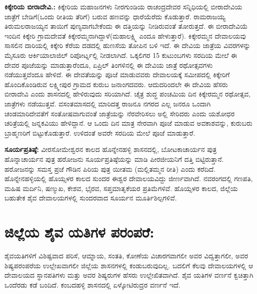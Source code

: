 \textbf{ಕಿಕ್ಕೇರಿಯ ಬೀರಾದೇವಿ.:} ಕಿಕ್ಕೇರಿಯ ಮಹಾಜನಗಳು ನೀರಗುಂಡಿಯ ರಾಚಂದ್ರದೇವರ ಸನ್ನಿಧಿಯಲ್ಲಿ ಬೀರಾದೇವಿಯ ಜಾತ್ರೆಗೆ ಬೇಡಿಗೆ(ಒಂದು ರೀತಿಯ ತೆರಿಗೆ) ಬರುವ ಹಣವನ್ನು ಧಾರೆಯೆರೆದು ಕೊಡುತ್ತಾರೆ. ರಾಮರಾಜಯ್ಯ ತಿರುಮಲರಾಜಯ್ಯನ ತಾಯಿಗೆ ಪುಣ್ಯವಾಗಬೇಕೆಂದು ಈ ದತ್ತಿಯನ್ನು ನೀಡಿರುವಂತೆ ತೋರುತ್ತದೆ. ಈ ಬೀರಾದೇವಿಯೆ ಇಂದಿನ ಕಿಕ್ಕೇರಿ ಗ್ರಾಮದೇವತೆ ಕಿಕ್ಕೇರಮ್ಮನಾಗಿದ್ದಾಳೆ(ಮಹಾಲಕ್ಷ್ಮಿ ಎಂದೂ ಹೇಳುತ್ತಾರೆ). ಕಿಕ್ಕೇರಮ್ಮನ ದೇವಾಲಯವು ಸಾಸಲಿನ ದಾರಿಯಲ್ಲಿ ಕಿಕ್ಕೇರಿ ಕೆರೆಯ ದಡದಲ್ಲಿ ಹುಣಸೆಯ ತೋಪಿನ ಬಳಿ ಇದೆ. ಈ ದೇವಿಯ ಜಾತ್ರೆಯ ವಿವರಗಳನ್ನು ಮೈಸೂರು ಆರ್ಕಿಯಾಲಾಜಿಲ್​ ರಿಪೋರ್ಟ್ನಲ್ಲಿ ನೀಡಲಾಗಿದೆ. ಒಕ್ಕಲಿಗರ 15 ಕುಟುಂಬಗಳು ಸರದಿಯ ಮೇಲೆ ಈ ದೇವರ ಪೂಜೆಯನ್ನು ಮಾಡುತ್ತಾರೆಂದೂ, ಏಪ್ರಿಲ್​ ತಿಂಗಳಿನಲ್ಲಿ ಈ ದೇವಿಯ ಜಾತ್ರೆ ರಥೋತ್ಸವಗಳು ನಡೆಯುತ್ತವೆಂದೂ ಹೇಳಿದೆ. ಈ ದೇವತೆಯನ್ನು ಪೂಜೆ ಮಾಡುವವರು ದೇವಾಲಯಕ್ಕೆ ಸಮೀಪದಲ್ಲಿ ಕಿಕ್ಕೇರಿಗೆ ಹೊಂದಿಕೊಂಡಿರುವ ಲಕ್ಷ್ಮೀಪುರ ಗ್ರಾಮದ ಕುರುಬ ಜನಾಂಗದವರು. ಆದುದರಿಂದಲೇ ಈ ದೇವಿಯ ಹೆಸರು ಬೀರಾದೇವಿ ಎಂದು ಶಾಸನದಲ್ಲಿ ಹೇಳಿರುವುದು ಸರಿಯಾಗಿದೆ. ಚೈತ್ರ ಶುದ್ಧ ಪಂಚಮಿಯ ದಿನ ಕಿಕ್ಕೇರಮ್ಮನ ರಥೋತ್ಸವ, ಜಾತ್ರೆಗಳು ನಡೆಯುತ್ತವೆ. ವಸಂತಮಾಸದಲ್ಲಿ ಮಾರಿದತ್ತ ರಾಜನೂ ನಗರದ ಎಲ್ಲ ಜನರೂ ಒಂದಾಗಿ ಚಂಡಮಾರಿದೇವತೆಗೆ ಸಂತೋಷವಾಗುವಂತೆ ಜಾತ್ರೆಯನ್ನು ನೆರವೇರಿಸಲು ಅಲ್ಲಿ ಸೇರಿದರು ಎಂದು ಯಶೋಧರ ಚರಿತ್ರೆಯಲ್ಲಿ ಜನ್ನಕವಿಯು ಹೇಳಿದ್ದಾನೆ. ಆ ಒಂದು ದಿನ ಮಾತ್ರ ನೇರವಾಗಿ ಪೂಜೆ ಮಾಡುವ ಅವಕಾಶವನ್ನು, ಕುರುಬರು ಬ್ರಾಹ್ಮಣರಿಗೆ ಬಿಟ್ಟುಕೊಡುತ್ತಾರೆ. ಉಳಿದಂತೆ ಅವರೇ ಸರದಿಯ ಮೇಲೆ ಪೂಜೆ ಮಾಡುತ್ತಾರೆ. 

\textbf{ಸೂರ್ಯಪ್ರತಿಷ್ಠೆ:} ವೀರಸೋಮೇಶ್ವರನ ಕಾಲದ ಹೊನ್ನೇನಹಳ್ಳಿ ಶಾಸನದಲ್ಲಿ, ಬೋಟಕಾಚಾರ್ಯನ ಪುತ್ರ ಹೊನ್ನಾಚಾರ್ಯನ ಪುತ್ರ ಹರೋಜನು ಸೂರ್ಯಪ್ರತಿಷ್ಠೆಯನ್ನು ಮಾಡಿ ಪೀರಜೀಯನಿಗೆ ದತ್ತಿ ಬಿಟ್ಟಿರುತ್ತಾನೆ. ಹರೋಜನನ್ನು ಸಮಸ್ತ ಪ್ರಜೆ ಗೌಡಿನ ಪಿರಿಯ ಪುತ್ರ ಯೀತಮ (ಮಲ್ಲಿತಮ್ಮನ ರೀತಿ) ಎಂದು ಕರೆದಿದೆ. ಹೊನ್ನೇನಹಳ್ಳಿಯಲ್ಲಿ ಹೊಯ್ಸಳರ ಕಾಲದ ಸುಂದರ ಈಶ್ವರ ದೇವಾಲಯವಿದ್ದು ಜೀರ್ಣವಾಗಿದೆ. ನವರಂಗದಲ್ಲಿ ಗಣಪತಿ, ಮಹಿಷ ಮರ್ದಿನಿ, ಷಣ್ಮುಖ, ಕೇಶವ, ಭೈರವ, ಸಪ್ತಮಾತೃಕೆಯರ ಪ್ರತಿಮೆಗಳಿವೆ. ಹೊಯ್ಸಳರ ಕಾಲದ, ಜಿಲ್ಲೆಯ ಬಹುತೇಕ ಶೈವ ದೇವಾಲಯಗಳಲ್ಲಿ ಸುಂದರವಾದ ಸೂರ್ಯನ ಮೂರ್ತಿಶಿಲ್ಪಗಳಿವೆ.


\section{ಜಿಲ್ಲೆಯ ಶೈವ ಯತಿಗಳ ಪರಂಪರೆ:}

ಶೈವಯತಿಗಳಿಗೆ ವಿಶಿಷ್ಟವಾದ ಪರಿಸೆ, ಆಮ್ನಾಯ, ಸಂತತಿ, ಕೋಣೆಯ ವಿಚಾರಗವಾಗಲೀ ಅವರ ವಿದ್ವತ್ತಾಗಲೀ, ಅವರ ಶಿಷ್ಯಪರಂಪರೆಯ ಉಲ್ಲೇಖವಾಗಲೀ ಜಿಲ್ಲೆಯ ಶಾಸನಗಳಲ್ಲಿ ಕಂಡುಬರುವುದಿಲ್ಲ. ಬದಲಿಗೆ ಕೆಲವು ದೇವಾಲಯಗಳಲ್ಲಿ ಆ ದೇವಾಲಯದ ಸ್ಥಾನಪತಿಗಳು ಮತ್ತು ಅವರ ಶಿಷ್ಯರುಗಳ ಹೆಸರು ಉಲ್ಲೇಖಿತವಾಗಿದೆ. ಶೈವ ಯತಿಗಳ ವರ್ಣನೆ ಕ್ವಚಿತ್ತಾಗಿ ಒಂದೆರಡು ಕಡೆ ಬಂದಿದೆ. ಕಂಬದಹಳ್ಳಿ ಶಾಸನದಲ್ಲಿ ಏಳ್ಕೋಟಿರುದ್ರರ ವರ್ಣನೆ ಇದೆ.

